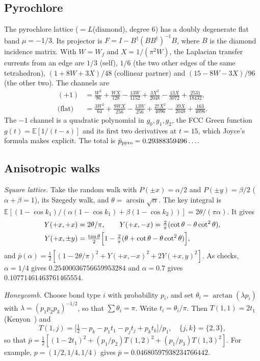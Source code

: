 \documentclass[aps,pra,10pt,twocolumn,superscriptaddress,nofootinbib]{revtex4-2}
\newcommand{\E}{\mathbb{E}}
\newcommand{\pbar}{\bar{p}}
\begin{document}
\subsection{Pyrochlore}

The pyrochlore lattice ($=L$(diamond), degree 6) has a doubly degenerate flat band
$\mu=-1/3$. Its projector is $F=I-B^\dagger(BB^\dagger)^{-1}B$, where $B$ is the diamond
incidence matrix. With $W=W_f$ and $X=1/(\pi^2W)$, the Laplacian transfer currents from an edge are
$1/3$ (self), $1/6$ (the two other edges of the same tetrahedron),
$(1+8W+3X)/48$ (collinear partner) and $(15-8W-3X)/96$ (the other two). The channels are
\begin{align}
(+1)&=\tfrac{W^2}{96}+\tfrac{WX}{128}-\tfrac{13W}{1152}+\tfrac{3X^2}{2048}-\tfrac{13X}{3072}+\tfrac{2531}{18432},\\
\text{(flat)}&=\tfrac{3W^2}{64}+\tfrac{9WX}{256}-\tfrac{13W}{256}+\tfrac{27X^2}{4096}-\tfrac{39X}{2048}+\tfrac{163}{4096}.
\end{align}
The $-1$ channel is a quadratic polynomial in $g_0,g_1,g_2$, the FCC Green function
$g(t)=\E[1/(t-s)]$ and its first two derivatives at $t=15$, which Joyce's formula makes explicit.
The total is $\pbar_{\rm pyro}=0.29388359496\ldots$.

\subsection{Anisotropic walks}

\emph{Square lattice.} Take the random walk with $P(\pm x)=\alpha/2$ and $P(\pm y)=\beta/2$
($\alpha+\beta=1$), its Szegedy walk, and $\theta=\arcsin\sqrt\alpha$. The key integral is
$\E[(1-\cos k_1)/(\alpha(1-\cos k_1)+\beta(1-\cos k_2))]=2\theta/(\pi\alpha)$. It gives
\begin{align}
Y(+x,+x)&=2\theta/\pi,\qquad
Y(+x,-x)=\tfrac2\pi(\cot\theta-\theta\cot^2\theta),\\
Y(+x,\pm y)&=\tfrac{\tan\theta}{2}\Bigl[1-\tfrac2\pi(\theta+\cot\theta-\theta\cot^2\theta)\Bigr],
\end{align}
and $\pbar(\alpha)=\tfrac12[(1-2\theta/\pi)^2+Y(+x,-x)^2+2Y(+x,y)^2]$. As checks,
$\alpha=1/4$ gives $0.25400036756659953284$ and $\alpha=0.7$ gives $0.10771461463761465554$.

\emph{Honeycomb.} Choose bond type $i$ with probability $p_i$, and set
$\theta_i=\arctan(\lambda p_i)$ with $\lambda=(p_1p_2p_3)^{-1/2}$, so that $\sum\theta_i=\pi$.
Write $t_i=\theta_i/\pi$. Then $T(1,1)=2t_1$ (Kenyon~\cite{Kenyon2002}) and
\begin{equation}
T(1,j)=\bigl[\tfrac12-p_k-p_1t_1-p_jt_j+p_kt_k\bigr]/p_1,\quad\{j,k\}=\{2,3\},
\end{equation}
so that $\pbar=\tfrac12[(1-2t_1)^2+(p_1/p_2)T(1,2)^2+(p_1/p_3)T(1,3)^2]$. For example,
$p=(1/2,1/4,1/4)$ gives $\pbar=0.04680597938234766442$.
\end{document}
